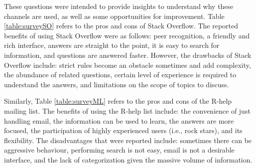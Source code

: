 \documentclass{sig-alternate-05-2015}
\begin{document}
	These questions were intended to provide insights to understand why these channels are used, as well as some opportunities for improvement.
	Table \ref{table:surveySO} refers to the pros and cons of Stack Overflow.
	The reported benefits of using Stack Overflow were as follows: peer recognition, a friendly and rich interface, answers are straight to the point, it is easy to search for information, and questions are answered faster.
	However, the drawbacks of Stack Overflow include: strict rules become an obstacle sometimes and add complexity, the abundance of related questions, certain level of experience is required to understand the answers, and limitations on the scope of topics to discuss.

	Similarly, Table \ref{table:surveyML} refers to the pros and cons of the R-help mailing list.
	The benefits of using the R-help list include: the convenience of just handling email, the information can be used to learn, the answers are more focused, the participation of highly experienced users (i.e., rock stars), and its flexibility.
	The disadvantages that were reported include: sometimes there can be aggressive behaviour, performing search is not easy, email is not a desirable interface, and the lack of categorization given the massive volume of information.
\end{document}

